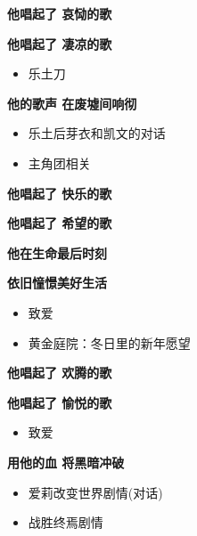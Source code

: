 \documentclass[a4paper]{article}
\begin{document}
\textbf{他唱起了 哀恸的歌}

\textbf{他唱起了 凄凉的歌}

\begin{itemize}
    \item 乐土刀
\end{itemize}

\textbf{他的歌声 在废墟间响彻}

\begin{itemize}
    \item 乐土后芽衣和凯文的对话
    \item 主角团相关
\end{itemize}

\textbf{他唱起了 快乐的歌}

\textbf{他唱起了 希望的歌}

\textbf{他在生命最后时刻}

\textbf{依旧憧憬美好生活}

\begin{itemize}
    \item 致爱
    \item 黄金庭院：冬日里的新年愿望
\end{itemize}

\textbf{他唱起了 欢腾的歌}

\textbf{他唱起了 愉悦的歌}

\begin{itemize}
    \item 致爱
\end{itemize}

\textbf{用他的血 将黑暗冲破}

\begin{itemize}
    \item 爱莉改变世界剧情(对话)
    \item 战胜终焉剧情
\end{itemize}
\end{document}
